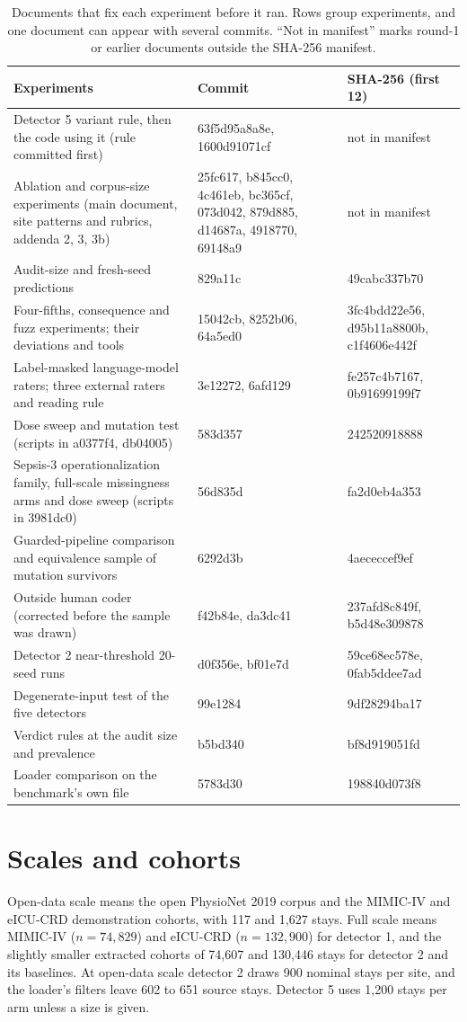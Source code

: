 \documentclass[10pt]{article}
\theoremstyle{definition}
\begin{document}
\begin{table}[h]
\centering\footnotesize
\begin{tabular}{@{}p{5.0cm}p{3.7cm}p{3.7cm}@{}}
\toprule
Experiments & Commit & SHA-256 (first 12)\\
\midrule
Detector 5 variant rule, then the code using it (rule committed first) & 63f5d95a8a8e, 1600d91071cf & not in manifest\\
Ablation and corpus-size experiments (main document, site patterns and rubrics, addenda 2, 3, 3b) & 25fc617, b845cc0, 4c461eb, bc365cf, 073d042, 879d885, d14687a, 4918770, 69148a9 & not in manifest\\
Audit-size and fresh-seed predictions & 829a11c & 49cabc337b70\\
Four-fifths, consequence and fuzz experiments; their deviations and tools & 15042cb, 8252b06, 64a5ed0 & 3fc4bdd22e56, d95b11a8800b, c1f4606e442f\\
Label-masked language-model raters; three external raters and reading rule & 3e12272, 6afd129 & fe257c4b7167, 0b91699199f7\\
Dose sweep and mutation test (scripts in a0377f4, db04005) & 583d357 & 242520918888\\
Sepsis-3 operationalization family, full-scale missingness arms and dose sweep (scripts in 3981dc0) & 56d835d & fa2d0eb4a353\\
Guarded-pipeline comparison and equivalence sample of mutation survivors & 6292d3b & 4aececcef9ef\\
Outside human coder (corrected before the sample was drawn) & f42b84e, da3dc41 & 237afd8c849f, b5d48e309878\\
Detector 2 near-threshold 20-seed runs & d0f356e, bf01e7d & 59ce68ec578e, 0fab5ddee7ad\\
Degenerate-input test of the five detectors & 99e1284 & 9df28294ba17\\
Verdict rules at the audit size and prevalence & b5bd340 & bf8d919051fd\\
Loader comparison on the benchmark's own file & 5783d30 & 198840d073f8\\
\bottomrule
\end{tabular}
\caption{Documents that fix each experiment before it ran. Rows group experiments, and one document can appear with several commits. ``Not in manifest'' marks round-1 or earlier documents outside the SHA-256 manifest.}
\label{tab:spec}
\end{table}

\section{Scales and cohorts}
\label{apd:scale}
Open-data scale means the open PhysioNet 2019 corpus and the MIMIC-IV and eICU-CRD demonstration cohorts, with 117 and 1,627 stays. Full scale means MIMIC-IV ($n=74{,}829$) and eICU-CRD ($n=132{,}900$) for detector 1, and the slightly smaller extracted cohorts of 74,607 and 130,446 stays for detector 2 and its baselines. At open-data scale detector 2 draws 900 nominal stays per site, and the loader's filters leave 602 to 651 source stays. Detector 5 uses 1,200 stays per arm unless a size is given.
\end{document}
